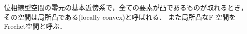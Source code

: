 	\begin{screen}
		\begin{dfn}
			位相線型空間の零元の基本近傍系で，全ての要素が凸であるものが取れるとき，
			その空間は局所凸である(locally convex)と呼ばれる．
			また局所凸なF-空間をFrechet空間と呼ぶ．
		\end{dfn}
	\end{screen}
	
	\begin{screen}
		\begin{thm}[局所凸空間とはセミノルムの族で生成される空間]
			
		\end{thm}
	\end{screen}